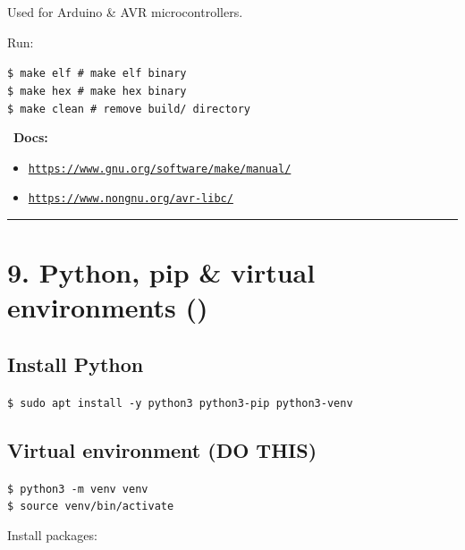\documentclass[12pt]{article}
\newcommand{\pythonicon}{\faPython}
\newcommand{\bookicon}{\faBook}
\begin{document}
Used for Arduino \& AVR microcontrollers.

Run:

\begin{highlightbox}
\texttt{\$ make elf \# make elf binary}\\
\texttt{\$ make hex \# make hex binary}\\
\texttt{\$ make clean \# remove build/ directory}
\end{highlightbox}

\begin{infobox}
\bookicon\ \textbf{Docs:}
\begin{itemize}
    \item \href{https://www.gnu.org/software/make/manual/}{\texttt{https://www.gnu.org/software/make/manual/}}
    \item \href{https://www.nongnu.org/avr-libc/}{\texttt{https://www.nongnu.org/avr-libc/}}
\end{itemize}
\end{infobox}

\vspace{1em}
\begin{center}
\color{teamred}\rule{0.8\textwidth}{1pt}
\end{center}

\section*{9. Python, pip \& virtual environments (\pythonicon)}

\subsection*{Install Python}

\begin{highlightbox}
\texttt{\$ sudo apt install -y python3 python3-pip python3-venv}
\end{highlightbox}

\subsection*{Virtual environment (DO THIS)}

\begin{highlightbox}
\texttt{\$ python3 -m venv venv}\\
\texttt{\$ source venv/bin/activate}
\end{highlightbox}

Install packages:
\end{document}
